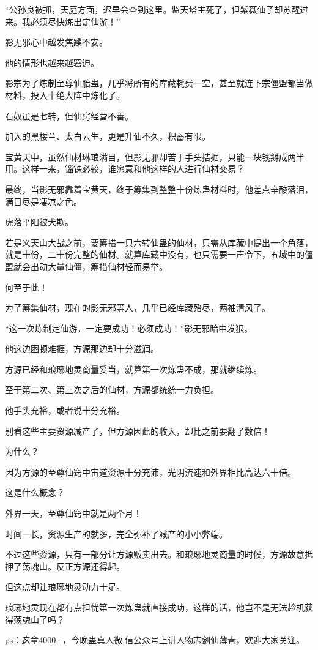 \begin{this_body}
“公孙良被抓，天庭方面，迟早会查到这里。监天塔主死了，但紫薇仙子却苏醒过来。我必须尽快炼出定仙游！”

影无邪心中越发焦躁不安。

他的情形也越来越窘迫。

影宗为了炼制至尊仙胎蛊，几乎将所有的库藏耗费一空，甚至就连下宗僵盟都当做材料，投入十绝大阵中炼化了。

石奴虽是七转，但仙窍经营不善。

加入的黑楼兰、太白云生，更是升仙不久，积蓄有限。

宝黄天中，虽然仙材琳琅满目，但影无邪却苦于手头拮据，只能一块钱掰成两半用。这样一来，锱铢必较，谁愿意和他这样的人进行仙材交易？

最终，当影无邪靠着宝黄天，终于筹集到整整十份炼蛊材料时，他差点辛酸落泪，满目尽是凄凉之色。

虎落平阳被犬欺。

若是义天山大战之前，要筹措一只六转仙蛊的仙材，只需从库藏中提出一个角落，就是十份，二十份完整的仙材。就算库藏中没有，也只需要一声令下，五域中的僵盟就会出动大量仙僵，筹措仙材轻而易举。

何至于此！

为了筹集仙材，现在的影无邪等人，几乎已经库藏殆尽，两袖清风了。

“这一次炼制定仙游，一定要成功！必须成功！”影无邪暗中发狠。

他这边困顿难捱，方源那边却十分滋润。

方源已经和琅琊地灵商量妥当，就算第一次炼蛊不成，那就继续炼。

至于第二次、第三次之后的仙材，方源都统统一力负担。

他手头充裕，或者说十分充裕。

别看这些主要资源减产了，但方源因此的收入，却比之前要翻了数倍！

为什么？

因为方源的至尊仙窍中宙道资源十分充沛，光阴流速和外界相比高达六十倍。

这是什么概念？

外界一天，至尊仙窍中就是两个月！

时间一长，资源生产的就多，完全弥补了减产的小小弊端。

不过这些资源，只有一部分让方源贩卖出去。和琅琊地灵商量的时候，方源故意抵押了荡魂山。反正方源还得起。

但这点却让琅琊地灵动力十足。

琅琊地灵现在都有点担忧第一次炼蛊就直接成功，这样的话，他岂不是无法趁机获得荡魂山了吗？

ps：这章4000+，今晚蛊真人微.信公众号上讲人物志剑仙薄青，欢迎大家关注。

\end{this_body}

